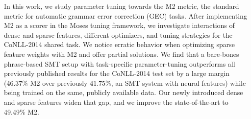 In this work, we study parameter tuning towards the M2 metric, the standard metric for automatic grammar error correction (GEC) tasks. After implementing M2 as a scorer in the Moses tuning framework, we investigate interactions of dense and sparse features, different optimizers, and tuning strategies for the CoNLL-2014 shared task. We notice erratic behavior when optimizing sparse feature weights with M2 and offer partial solutions. We find that a bare-bones phrase-based SMT setup with task-specific parameter-tuning outperforms all previously published results for the CoNLL-2014 test set by a large margin (46.37\% M2 over previously 41.75\%, an SMT system with neural features) while being trained on the same, publicly available data. Our newly introduced dense and sparse features widen that gap, and we improve the state-of-the-art to 49.49\% M2.
